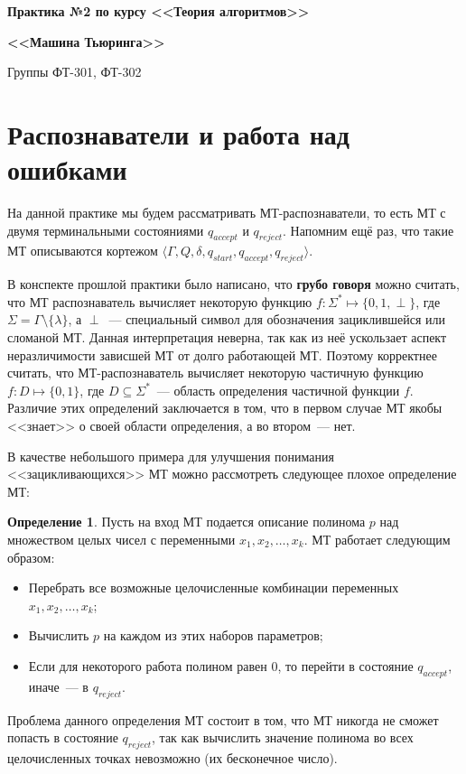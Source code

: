 \documentclass[
    11pt,
    a4paper
]{article}
\theoremstyle{definition}
\newtheorem{definition}{Определение}
\begin{document}
\centerline{\Large \bf Практика №2 по курсу <<Теория алгоритмов>>}
\centerline{\Large \bf <<Машина Тьюринга>>}
\centerline{Группы ФТ-301, ФТ-302}

\section{Распознаватели и работа над ошибками}

На данной практике мы будем рассматривать МТ-распознаватели, то есть МТ с двумя терминальными состояниями $q_{accept}$ и $q_{reject}$. Напомним ещё раз, что такие МТ описываются кортежом $\langle \Gamma, Q, \delta, q_{start}, q_{accept}, q_{reject} \rangle$. 

В конспекте прошлой практики было написано, что \textbf{грубо говоря} можно считать, что МТ распознаватель вычисляет некоторую функцию $f: \Sigma^* \mapsto \{0, 1, \perp\}$, где $\Sigma = \Gamma \setminus \{ \lambda \}$, а $\perp$~--- специальный символ для обозначения зациклившейся или сломаной МТ. Данная интерпретация неверна, так как из неё ускользает аспект неразличимости зависшей МТ от долго работающей МТ. Поэтому корректнее считать, что МТ-распознаватель вычисляет некоторую частичную функцию $f: D \mapsto \{0, 1\}$, где $D \subseteq \Sigma^*$~--- область определения частичной функции $f$. Различие этих определений заключается в том, что в первом случае МТ якобы <<знает>> о своей области определения, а во втором~--- нет.

В качестве небольшого примера для улучшения понимания <<зацикливающихся>> МТ можно рассмотреть следующее плохое определение МТ:
\begin{definition}
Пусть на вход МТ подается описание полинома $p$ над множеством целых чисел с переменными $x_1, x_2, \dots, x_k$. МТ работает следующим образом:
\begin{itemize}
\item Перебрать все возможные целочисленные комбинации переменных $x_1, x_2, \dots, x_k$;
\item Вычислить $p$ на каждом из этих наборов параметров;
\item Если для некоторого работа полином равен $0$, то перейти в состояние $q_{accept}$, иначе~--- в $q_{reject}$.
\end{itemize}
\end{definition}

Проблема данного определения МТ состоит в том, что МТ никогда не сможет попасть в состояние $q_{reject}$, так как вычислить значение полинома во всех целочисленных точках невозможно (их бесконечное число).
\end{document}
